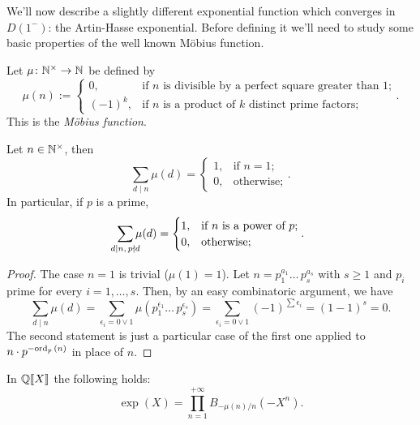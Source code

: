  		We'll now describe a slightly different exponential function which converges in $D(1^-)$: the Artin-Hasse exponential. Before defining it we'll need to study some basic properties of the well known M{\"o}bius function.
 		\begin{defn}
 			Let $\mu\colon \mathbb{N}^\times \to \mathbb{N}$ be defined by
 			\[
 				\mu(n) := 
 				\begin{cases}
	 				0, & \text{if $n$ is divisible by a perfect square greater than 1;}\\
	 				(-1)^k, & \text{if $n$ is a product of $k$ distinct prime factors;}
 				\end{cases}.
 			\]
 			This is the \emph{M{\"o}bius function}.
 		\end{defn}
 		\begin{prop}
	 		\label{prop:mobius-function}
	 		Let $n \in \mathbb{N}^\times$, then
	 		\[
	 			\sum_{d \mid n} \mu(d) =
	 			\begin{cases}
		 			1, & \text{if $n=1$;} \\
		 			0, & \text{otherwise;}
	 			\end{cases}.
	 		\]
	 		In particular, if $p$ is a prime,
	 		\[
	 			\sum_{\mathclap{d \mid n,\,p \nmid d}} \mu(d) = 
	 			\begin{cases}
		 			1, & \text{if $n$ is a power of $p$;} \\
		 			0, & \text{otherwise;}
	 			\end{cases}.
	 		\]
 		\end{prop}
 		\begin{proof}
 			The case $n=1$ is trivial ($\mu(1) = 1$). Let $n = p_1^{a_1}\dots \,p_s^{a_s}$ with $s \geq 1$ and $p_i$ prime for every $i=1,\dots,s$. Then, by an easy combinatoric argument, we have
 			\[
 				\sum_{d \mid n} \mu(d) = \sum_{\epsilon_i = 0 \lor 1} \mu(p_1^{\epsilon_1}\dots\,p_s^{\epsilon_s}) = \sum_{\epsilon_i = 0 \lor 1} (-1)^{\sum \epsilon_i} = (1 - 1)^s = 0.
 			\]
 			The second statement is just a particular case of the first one applied to $n \cdot p^{-\textrm{ord}_p\,(n)}$ in place of $n$.
 		\end{proof}
 		\begin{prop}
 			\label{prop:formal-identity-exp}
 			In $\mathbb{Q}\llbracket X \rrbracket$ the following holds:
 			\[
 				\exp(X) = \prod_{n=1}^{+\infty} B_{-\mu(n)/n}(-X^n).
 			\]
 		\end{prop}
